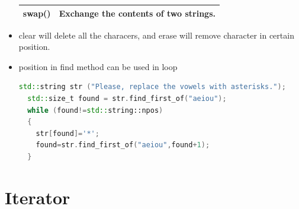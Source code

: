 \documentclass[a4paper,12pt,twoside]{book}
\begin{document}
\begin{itemize}
\begin{tabular}{| p{} |p{}|}
\hline
swap() & Exchange the contents of two strings. \\
\hline
\end{tabular}

\item clear will delete all the characers, and erase will remove character in certain position.

\item position in find method can be used in loop
\begin{lstlisting}[frame=single, language=c++]
std::string str ("Please, replace the vowels with asterisks.");
  std::size_t found = str.find_first_of("aeiou");
  while (found!=std::string::npos)
  {
    str[found]='*';
    found=str.find_first_of("aeiou",found+1);
  }
\end{lstlisting}


\end{itemize}


\section{Iterator}
\end{document}
